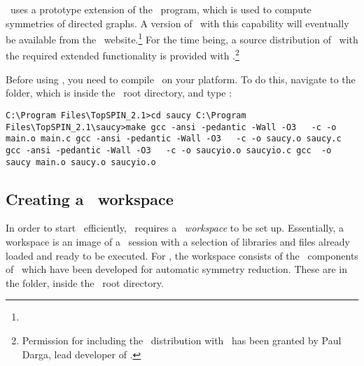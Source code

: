 \topspin\ uses a prototype extension of the \saucy\ program, which
is used to compute symmetries of directed graphs.  A version of
\saucy\ with this capability will eventually be available from the
\saucy\ website.\footnote{\texttt{\saucywebpage}} For the time
being, a source distribution of \saucy\ with the required extended
functionality is provided with \topspin.\footnote{Permission for
including the \saucy\ distribution with \topspin\ has been granted
by Paul Darga, lead developer of \saucy.}

Before using \topspin, you need to compile \saucy\ on your platform.
To do this, navigate to the  folder, which is inside
the \topspin\ root directory, and type :
%
\begin{lstlisting}
C:\Program Files\TopSPIN_2.1>cd saucy C:\Program
Files\TopSPIN_2.1\saucy>make gcc -ansi -pedantic -Wall -O3   -c -o
main.o main.c gcc -ansi -pedantic -Wall -O3   -c -o saucy.o saucy.c
gcc -ansi -pedantic -Wall -O3   -c -o saucyio.o saucyio.c gcc  -o
saucy main.o saucy.o saucyio.o
\end{lstlisting}
%
\subsection{Creating a \protect\gap\ workspace}\label{sec:downloadandinstall:gapworkspace}
%
In order to start \gap\ efficiently, \topspin\ requires a \gap\
\emph{workspace} to be set up.  Essentially, a workspace is an image
of a \gap\ session with a selection of libraries and files already
loaded and ready to be executed.  For \topspin, the workspace
consists of the \gap\ components of \topspin\ which have been
developed for automatic symmetry reduction.  These are in the
 folder, inside the \topspin\ root directory.

